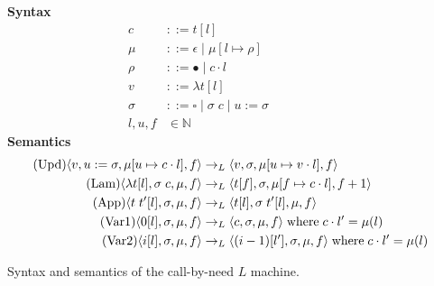 \begin{figure*}
\textbf{Syntax}
\begin{align*}
\tag{Closure} c &::= t [l] \\
\tag{Heap} \mu &::= \epsilon \; | \; \mu [ l \mapsto \rho ] \\
\tag{Environment} \rho &::= \bullet \; | \; c \cdot l \\
\tag{Value} v &::= \lambda t[l] \\
\tag{Stack} \sigma &::= \square \; | \; \sigma \; c \;  | \; u:=\sigma \\
\tag{Location} l,u,f &\in \mathbb{N}
\end{align*}
\textbf{Semantics}
\begin{align*}
\tag{Upd}
\langle v, u := \sigma, \mu[u \mapsto c \cdot l], f \rangle 
  &\rightarrow_{L} 
\langle v, \sigma, \mu[u \mapsto v \cdot l], f \rangle  \\
\tag{Lam}
\langle \lambda t[l], \sigma \; c, \mu, f \rangle 
  &\rightarrow_{L}
\langle t[f], \sigma, \mu[f \mapsto c \cdot l], f+1 \rangle  \\
\tag{App}
\langle t \; t'[l], \sigma, \mu, f \rangle
  &\rightarrow_{L}
\langle t[l], \sigma \; t'[l], \mu, f \rangle \\
\tag{Var1}
\langle 0[l], \sigma, \mu, f \rangle
  &\rightarrow_{L}
\langle c, \sigma, \mu, f \rangle 
\; \textnormal{where} \; c \cdot l' = \mu(l)\\
\tag{Var2}
\langle i[l], \sigma, \mu, f \rangle
  &\rightarrow_{L}
\langle (i-1)[l'], \sigma, \mu, f \rangle
\; \textnormal{where} \; c \cdot l' = \mu(l) \\
\end{align*}
\caption{Syntax and semantics of the call-by-need $L$ machine.}
\label{fig:L}
\end{figure*}
